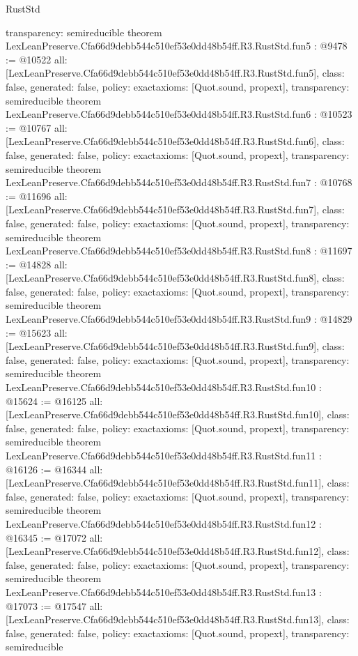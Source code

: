 \begin{lexlean}{RustStd}
\begin{coremodule}
{  transparency: semireducible
}
theorem LexLeanPreserve.Cfa66d9debb544c510ef53e0dd48b54ff.R3.RustStd.fun5 : @9478 := @10522 {
  all: [LexLeanPreserve.Cfa66d9debb544c510ef53e0dd48b54ff.R3.RustStd.fun5],
  class: false,
  generated: false,
  policy: exact{axioms: [Quot.sound, propext]},
  transparency: semireducible
}
theorem LexLeanPreserve.Cfa66d9debb544c510ef53e0dd48b54ff.R3.RustStd.fun6 : @10523 := @10767 {
  all: [LexLeanPreserve.Cfa66d9debb544c510ef53e0dd48b54ff.R3.RustStd.fun6],
  class: false,
  generated: false,
  policy: exact{axioms: [Quot.sound, propext]},
  transparency: semireducible
}
theorem LexLeanPreserve.Cfa66d9debb544c510ef53e0dd48b54ff.R3.RustStd.fun7 : @10768 := @11696 {
  all: [LexLeanPreserve.Cfa66d9debb544c510ef53e0dd48b54ff.R3.RustStd.fun7],
  class: false,
  generated: false,
  policy: exact{axioms: [Quot.sound, propext]},
  transparency: semireducible
}
theorem LexLeanPreserve.Cfa66d9debb544c510ef53e0dd48b54ff.R3.RustStd.fun8 : @11697 := @14828 {
  all: [LexLeanPreserve.Cfa66d9debb544c510ef53e0dd48b54ff.R3.RustStd.fun8],
  class: false,
  generated: false,
  policy: exact{axioms: [Quot.sound, propext]},
  transparency: semireducible
}
theorem LexLeanPreserve.Cfa66d9debb544c510ef53e0dd48b54ff.R3.RustStd.fun9 : @14829 := @15623 {
  all: [LexLeanPreserve.Cfa66d9debb544c510ef53e0dd48b54ff.R3.RustStd.fun9],
  class: false,
  generated: false,
  policy: exact{axioms: [Quot.sound, propext]},
  transparency: semireducible
}
theorem LexLeanPreserve.Cfa66d9debb544c510ef53e0dd48b54ff.R3.RustStd.fun10 : @15624 := @16125 {
  all: [LexLeanPreserve.Cfa66d9debb544c510ef53e0dd48b54ff.R3.RustStd.fun10],
  class: false,
  generated: false,
  policy: exact{axioms: [Quot.sound, propext]},
  transparency: semireducible
}
theorem LexLeanPreserve.Cfa66d9debb544c510ef53e0dd48b54ff.R3.RustStd.fun11 : @16126 := @16344 {
  all: [LexLeanPreserve.Cfa66d9debb544c510ef53e0dd48b54ff.R3.RustStd.fun11],
  class: false,
  generated: false,
  policy: exact{axioms: [Quot.sound, propext]},
  transparency: semireducible
}
theorem LexLeanPreserve.Cfa66d9debb544c510ef53e0dd48b54ff.R3.RustStd.fun12 : @16345 := @17072 {
  all: [LexLeanPreserve.Cfa66d9debb544c510ef53e0dd48b54ff.R3.RustStd.fun12],
  class: false,
  generated: false,
  policy: exact{axioms: [Quot.sound, propext]},
  transparency: semireducible
}
theorem LexLeanPreserve.Cfa66d9debb544c510ef53e0dd48b54ff.R3.RustStd.fun13 : @17073 := @17547 {
  all: [LexLeanPreserve.Cfa66d9debb544c510ef53e0dd48b54ff.R3.RustStd.fun13],
  class: false,
  generated: false,
  policy: exact{axioms: [Quot.sound, propext]},
  transparency: semireducible
}
\end{coremodule}
\end{lexlean}
